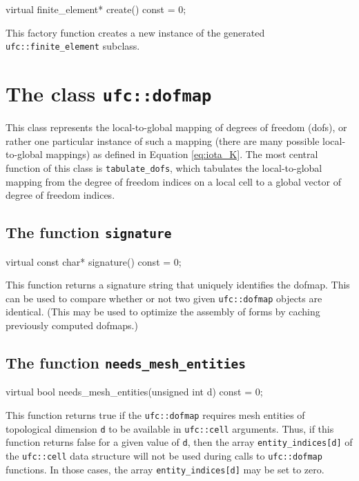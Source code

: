 \begin{code}
virtual finite_element* create() const = 0;
\end{code}

This factory function creates a new instance of the generated
\texttt{ufc::finite\_\-element} subclass.

\section{The class \texttt{ufc::dofmap}}

This class represents the local-to-global mapping of degrees of
freedom (dofs), or rather one particular instance of such a mapping
(there are many possible local-to-global mappings) as defined in
Equation \eqref{eq:iota_K}. The most central function of this class is
\texttt{tabulate\_dofs}, which tabulates the local-to-global mapping
from the degree of freedom indices on a local cell to a global vector of
degree of freedom indices.

\subsection{The function \texttt{signature}}

\begin{code}
virtual const char* signature() const = 0;
\end{code}

This function returns a signature string that uniquely identifies the
dofmap. This can be used to compare whether or not two given
\texttt{ufc::dofmap} objects are identical. (This may be used to
optimize the assembly of forms by caching previously computed
dofmaps.)

\subsection{The function \texttt{needs\_mesh\_entities}}

\begin{code}
virtual bool needs_mesh_entities(unsigned int d) const = 0;
\end{code}

This function returns true if the \texttt{ufc::dofmap} requires mesh
entities of topological dimension \texttt{d} to be available in
\texttt{ufc::cell} arguments. Thus, if this function returns false for
a given value of \texttt{d}, then the array
\texttt{entity\_indices[d]} of the \texttt{ufc::cell} data structure
will not be used during calls to \texttt{ufc::dofmap} functions. In
those cases, the array \texttt{entity\_indices[d]} may be set to zero.

